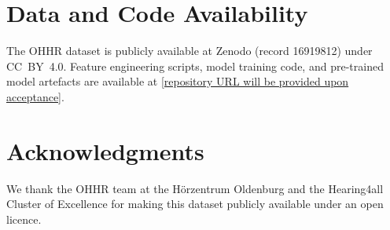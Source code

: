 \documentclass[conference]{IEEEtran}
\begin{document}
\section*{Data and Code Availability}
The OHHR dataset is publicly available at Zenodo (record 16919812) under
CC~BY~4.0.  Feature engineering scripts, model training code, and
pre-trained model artefacts are available at
\url{[repository URL will be provided upon acceptance]}.

\section*{Acknowledgments}
We thank the OHHR team at the Hörzentrum Oldenburg and the Hearing4all
Cluster of Excellence for making this dataset publicly available under an
open licence.
\end{document}
